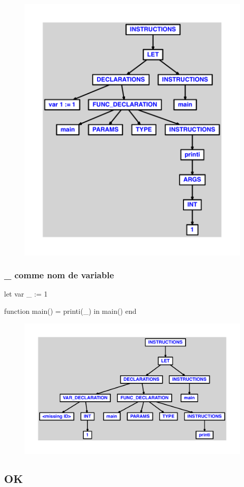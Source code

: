 \documentclass{article}
\begin{document}
\begin{figure}[H]\centering\includegraphics[max width=\textwidth]{ast/ast_292.pdf}\end{figure}\subsubsection{\_ comme nom de variable}
\begin{verbatimtab}
let
	var _ := 1

	function main() = printi(_)
in main() end
\end{verbatimtab}
\begin{figure}[H]\centering\includegraphics[max width=\textwidth]{ast/ast_293.pdf}\end{figure}\subsection{OK}
\end{document}
